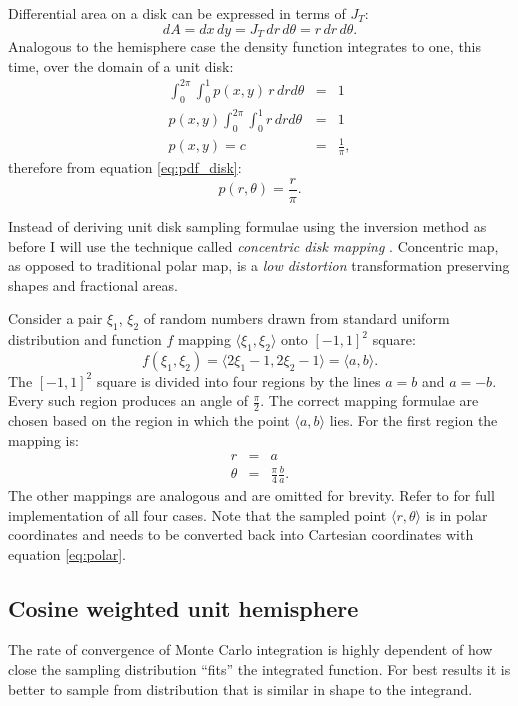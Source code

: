 Differential area on a disk can be expressed in terms of $J_{T}$:
\begin{equation}
  dA = dx\,dy = J_{T}\,dr\,d\theta = r\,dr\,d\theta.
\end{equation}
Analogous to the hemisphere case the density function integrates to one, this time, over the domain of a unit disk:
\begin{eqnarray}
  \int_{0}^{2\pi} \int_{0}^{1} p(x,y) \,r \,dr d\theta &=& 1 \nonumber \\
  p(x,y) \int_{0}^{2\pi} \int_{0}^{1} r \,dr d\theta &=& 1 \nonumber \\
  p(x,y) = c &=& \frac{1}{\pi},
\end{eqnarray}
therefore from equation \ref{eq:pdf_disk}:
\begin{equation}
  p(r, \theta) = \frac{r}{\pi}.
\end{equation}

Instead of deriving unit disk sampling formulae using the inversion method as before I will use the technique called \emph{concentric disk mapping} \parencite{shirley97}. Concentric map, as opposed to traditional polar map, is a \emph{low distortion} transformation preserving shapes and fractional areas.

Consider a pair $\xi_{1}$, $\xi_{2}$ of random numbers drawn from standard uniform distribution and function $f$ mapping $\langle \xi_{1}, \xi_{2} \rangle$ onto $[-1,1]^{2}$ square:
\begin{equation}
  f(\xi_{1}, \xi_{2}) = \langle 2\xi_{1} - 1, 2\xi_{2} - 1 \rangle = \langle a, b \rangle.
\end{equation}
The $[-1,1]^{2}$ square is divided into four regions by the lines $a=b$ and $a=-b$. Every such region produces an angle of $\frac{\pi}{2}$. The correct mapping formulae are chosen based on the region in which the point $\langle a, b \rangle$ lies. For the first region the mapping is:
\begin{eqnarray}
  r &=& a \nonumber \\
  \theta &=& \frac{\pi}{4} \frac{b}{a}.
\end{eqnarray}
The other mappings are analogous and are omitted for brevity. Refer to \cite{shirley97} for full implementation of all four cases. Note that the sampled point $\langle r, \theta \rangle$ is in polar coordinates and needs to be converted back into Cartesian coordinates with equation \ref{eq:polar}.

\subsection{Cosine weighted unit hemisphere}
The rate of convergence of Monte Carlo integration is highly dependent of how close the sampling distribution ``fits'' the integrated function. For best results it is better to sample from distribution that is similar in shape to the integrand.


